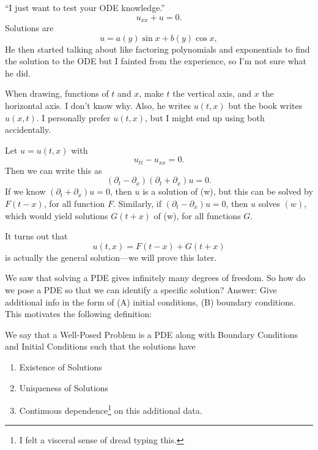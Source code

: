 \begin{example} 
	``I just want to test your ODE knowledge.''
	\[ u_{x x} + u = 0. \]
	Solutions are
	\[ u = a(y) \sin x + b(y) \cos x, \]
	He then started talking about like factoring polynomials and exponentials to find the solution to the ODE but I fainted from the experience, so I'm not sure what he did.
\end{example}

\begin{remark}
	When drawing, functions of \( t \) and \( x \), make \( t \) the vertical axis, and \( x \) the horizontal axis. I don't know why. Also, he writes \( u(t, x) \) but the book writes \( u(x, t) \). I personally prefer \( u(t, x) \), but I might end up using both accidentally.
\end{remark}

\begin{example}
	Let \( u = u(t, x) \) with
	\[ \tag{w}u_{tt} - u_{x x} = 0. \]
	Then we can write this as
	\[ (\partial_{t} - \partial_{x}) (\partial_{t} + \partial_{x})u = 0. \]
	If we know \( (\partial_{t} + \partial_{x})u = 0 \), then \( u \) is a solution of (w), but this can be solved by \( F(t - x) \), for all function \( F \). Similarly, if \( (\partial_{t} - \partial_{x})u = 0 \), then \( u \) solves \( (w) \), which would yield solutions \( G(t + x) \) of (w), for all functions \( G \).

	It turns out that
	\[ u(t, x) = F(t-x) + G(t+x) \]
	is actually the general solution---we will prove this later.
\end{example}

We saw that solving a PDE gives infinitely many degrees of freedom. So how do we pose a PDE so that we can identify a specific solution? Answer: Give additional info in the form of (A) initial conditions, (B) boundary conditions. This motivates the following definition:
\begin{definition}
	We say that a Well-Posed Problem is a PDE along with Boundary Conditions and Initial Conditions such that the solutions have
	\begin{enumerate}
	
		\item Existence of Solutions
		\item Uniqueness of Solutions
		\item Continuous dependence\footnote{I felt a visceral sense of dread typing this.} on this additional data.
	\end{enumerate}
\end{definition}

